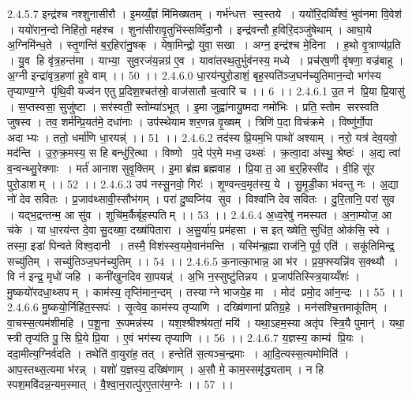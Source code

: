 2.4.5.7
इन्द्र॑श्च नश्शुनासीरौ । इ॒मय्यँ॒ज्ञं मि॑मिख्षतम् । गर्भ॑न्धत्त स्व॒स्तये । ययो॑रि॒दव्विँश्वं॒ भुव॑नमा वि॒वेश॑ । ययो॑रान॒न्दो निहि॑तो॒ मह॑श्च । शुना॑सीरावृ॒तुभि॑स्सव्विँदा॒नौ । इन्द्र॑वन्तौ ह॒विरि॒दञ्जु॑षेथाम् । आघा॒ये अ॒ग्निमि॑न्ध॒ते । स्तृ॒णन्ति॑ ब॒र्॒हिरा॑नु॒षक् । येषा॒मिन्द्रो॒ युवा॒ सखा । अग्न॒ इन्द्र॑श्च मे॒दिना । ह॒थो वृ॒त्राण्य॑प्र॒ति । यु॒व हि वृ॑त्र॒हन्त॑मा । याभ्या॒॒ सुव॒रज॑य॒न्नग्र॑ ए॒व । यावा॑तस्थ॒तुर्भुव॑नस्य॒ मध्ये । प्रच॑र्‌ष॒णी वृ॑षणा॒ वज्र॑बाहू । अ॒ग्नी इन्द्रा॑वृत्र॒हणा॑ हुवे वाम् ।। 50 ।।
2.4.6.0
धा॒रय॑न्पुरो॒डाशं॒ बृह॒स्पति॑ञ्ज॒घन॑च्युतिमान॒न्दो भग॑स्य तृप्याण्य॒ग्ने पृ॑थि॒वी यज्व॑न एतु प्र॒दिश॒श्चत॑स्रो॒ वाज॑सातौ च॒त्वारि॑ च ।। 6 ।।
2.4.6.1
उ॒त न॑ प्रि॒या प्रि॒यासु॑ । स॒प्तस्वसा॒ सुजु॑ष्टा । सर॑स्वती॒ स्तोम्या॑ऽभूत् । इ॒मा जुह्वा॑नायु॒ष्मदा नमो॑भिः । प्रति॒ स्तोम॑ सरस्वति जुषस्व । तव॒ शर्म॑न्प्रि॒यत॑मे॒ दधा॑नाः । उप॑स्थेयाम शर॒णन्न वृ॒ख्षम् । त्रिणि॑ प॒दा विच॑क्रमे । विष्णु॑र्गो॒पा अदाभ्यः । ततो॒ धर्मा॑णि धा॒रयन्न्॑ ।। 51 ।।
2.4.6.2
तद॑स्य प्रि॒यम॒भि पाथो॑ अश्याम् । नरो॒ यत्र॑ देव॒यवो॒ मद॑न्ति । उ॒रु॒क्र॒मस्य॒ स हि बन्धु॑रि॒त्था । विष्णो प॒दे प॑र॒मे मध्व॒ उथ्सः॑ । क्र॒त्वा॒दा अ॑स्थु॒ श्रेष्ठः॑ । अ॒द्य त्वा॑ व॒न्वन्थ्सु॒रेक्णाः । मर्त॑ आनाश सुवृ॒क्तिम् । इ॒मा ब्र॑ह्म ब्रह्मवाह । प्रि॒या त॒ आ ब॒र्॒हिस्सी॑द । वी॒हि सू॑र पुरो॒डाशम् ।। 52 ।।
2.4.6.3
उप॑ नस्सू॒नवो॒ गिरः॑ । शृ॒ण्वन्त्व॒मृत॑स्य॒ ये । सु॒मृ॒डी॒का भ॑वन्तु नः । अ॒द्या नो॑ देव सवितः । प्र॒जाव॑थ्सावी॒स्सौभ॑गम् । परा॑ दु॒ष्वप्नि॑य सुव । विश्वा॑नि देव सवितः । दु॒रि॒तानि॒ परा॑ सुव । यद्भ॒द्रन्तन्म॒ आ सु॑व । शुचि॑म॒र्कैर्बृह॒स्पतिम् ।। 53 ।।
2.4.6.4
अ॒ध्व॒रेषु॑ नमस्यत । अ॒ना॒म्योज॒ आ च॑के । या धा॒रय॑न्त दे॒वा सु॒दख्षा॒ दख्ष॑पितारा । अ॒सु॒र्या॑य॒ प्रम॑हसा । स इत् ख्षेति॒ सुधि॑त॒ ओक॑सि॒ स्वे । तस्मा॒ इडा॑ पिन्वते विश्व॒दानी । तस्मै॒ विश॑स्स्व॒यमे॒वान॑मन्ति । यस्मि॑न्ब्र॒ह्मा राज॑नि॒ पूर्व॒ एति॑ । सकू॑तिमिन्द्र॒ सच्यु॑तिम् । सच्यु॑तिञ्ज॒घन॑च्युतिम् ।। 54 ।।
2.4.6.5
क॒नात्का॒भान्न॒ आ भ॑र । प्र॒य॒फ्स्यन्नि॑व स॒क्थ्यौ । वि न॑ इन्द्र॒ मृधो॑ जहि । कनी॑खुनदिव सा॒पयन्न्॑ । अ॒भि न॒स्सुष्टु॑तिन्नय । प्र॒जाप॑तिस्स्त्रि॒याय्यँशः॑ । मु॒ष्कयो॑रदधा॒थ्सपम् । काम॑स्य॒ तृप्ति॑मान॒न्दम् । तस्याग्ने भाजये॒ह मा । मोद॑ प्रमो॒द आ॑न॒न्दः ।। 55 ।।
2.4.6.6
मु॒ष्कयो॒र्निहि॑त॒स्सपः॑ । सृ॒त्वेव॒ काम॑स्य तृप्याणि । दख्षि॑णानां प्रतिग्र॒हे । मन॑सश्चि॒त्तमाकू॑तिम् । वा॒चस्स॒त्यम॑शीमहि । प॒शू॒ना रू॒पमन्न॑स्य । यश॒श्श्रीश्श्र॑यतां॒ मयि॑ । यथा॒ऽहम॒स्या अतृ॑प स्त्रि॒यै पुमान्॑ । यथा॒ स्त्री तृप्य॑ति पु॒॒सि प्रि॒ये प्रि॒या । ए॒वं भग॑स्य तृप्याणि ।। 56 ।।
2.4.6.7
य॒ज्ञस्य॒ काम्य॑ प्रि॒यः । ददा॒मीत्य॒ग्निर्व॑दति । तथेति॑ वा॒युरा॑ह॒ तत् । हन्तेति॑ स॒त्यञ्च॒न्द्रमाः । आ॒दि॒त्यस्स॒त्यमोमिति॑ । आप॒स्तथ्स॒त्यमा भ॑रन्न् । यशो॑ य॒ज्ञस्य॒ दख्षि॑णाम् । अ॒सौ मे॒ काम॒स्समृ॑द्ध्यताम् । न हि स्पश॒मवि॑दन्न॒न्यम॒स्मात् । वै॒श्वा॒न॒रात्पु॑रए॒तार॑म॒ग्नेः ।। 57 ।।
